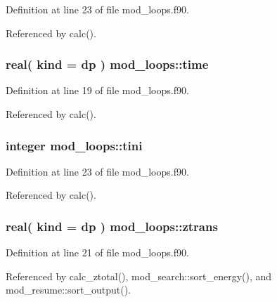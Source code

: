 Definition at line 23 of file mod\+\_\+loops.\+f90.



Referenced by calc().

\subsubsection[{\texorpdfstring{time}{time}}]{\setlength{\rightskip}{0pt plus 5cm}real( kind = dp ) mod\+\_\+loops\+::time}\hypertarget{namespacemod__loops_acb345fb5782ee4c7fd3c419baff2c135}{}\label{namespacemod__loops_acb345fb5782ee4c7fd3c419baff2c135}


Definition at line 19 of file mod\+\_\+loops.\+f90.



Referenced by calc().

\subsubsection[{\texorpdfstring{tini}{tini}}]{\setlength{\rightskip}{0pt plus 5cm}integer mod\+\_\+loops\+::tini}\hypertarget{namespacemod__loops_adc96eb69b7265038868c81104240ee96}{}\label{namespacemod__loops_adc96eb69b7265038868c81104240ee96}


Definition at line 23 of file mod\+\_\+loops.\+f90.



Referenced by calc().

\subsubsection[{\texorpdfstring{ztrans}{ztrans}}]{\setlength{\rightskip}{0pt plus 5cm}real( kind = dp ) mod\+\_\+loops\+::ztrans}\hypertarget{namespacemod__loops_a6975a502e7bc56e3b95ee8ed8db8e658}{}\label{namespacemod__loops_a6975a502e7bc56e3b95ee8ed8db8e658}


Definition at line 21 of file mod\+\_\+loops.\+f90.



Referenced by calc\+\_\+ztotal(), mod\+\_\+search\+::sort\+\_\+energy(), and mod\+\_\+resume\+::sort\+\_\+output().

